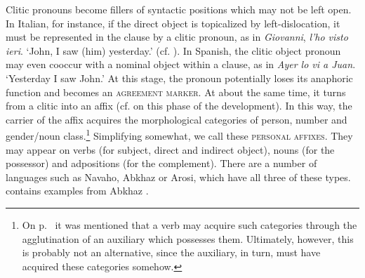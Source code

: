Clitic pronouns become fillers of syntactic positions which may not be left open. In Italian, for instance, if the direct object is topicalized by left-dislocation, it must be represented in the clause by a clitic pronoun, as in \textit{Giovanni}, \textit{l'ho visto ieri}. ‘John, I saw (him) yesterday.’ (cf. \citealt[154]{MallinsonEtAl1981}). In Spanish, the clitic object pronoun may even cooccur with a nominal object within a clause, as in \textit{Ayer lo vi a Juan}. ‘Yesterday I saw John.’\label{page44} At this stage, the pronoun potentially loses its anaphoric function and becomes an \textsc{agreement marker}. At about the same time, it turns from a clitic into an affix (cf. \citealt[496f]{Humboldt1836} on this phase of the development). In this way, the carrier of the affix acquires the morphological categories of person, number and gender/noun class.\footnote{On p.~\pageref{page31}\chkfn%
it was mentioned that a verb may acquire such categories through the agglutination of an auxiliary which possesses them. Ultimately, however, this is probably not an alternative, since the auxiliary, in turn, must have acquired these categories somehow.} Simplifying somewhat, we call these \textsc{personal affixes}. They may appear on verbs (for subject, direct and indirect object), nouns (for the possessor) and adpositions (for the complement). There are a number of languages such as Navaho, Abkhaz or Arosi, which have all three of these types.  contains examples from Abkhaz \citep[105, 116, 103]{Hewitt1979}. \enlargethispage{2\baselineskip}

